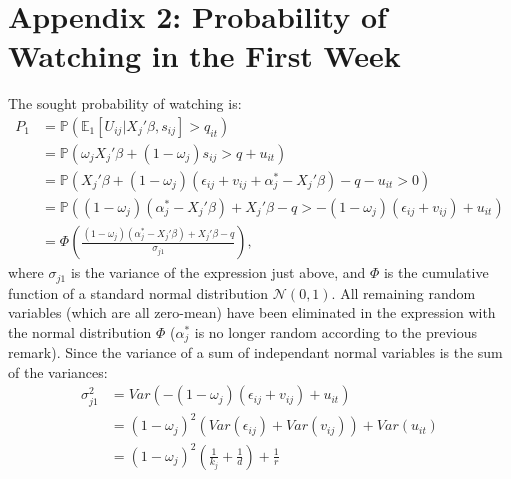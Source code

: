 \section*{Appendix 2: Probability of Watching in the First Week}

The sought probability of watching is:
\begin{align*}
	P_{1}&=\mathbb{P}(\mathbb{E}_1[U_{i j}|X_{j}'\beta, s_{i j}]>q_{i t})\\
	&=\mathbb{P}(\omega_{j} X_{j}'\beta+(1-\omega_{j})s_{i j}>q+u_{i t})\\
	&=\mathbb{P}(X_{j}'\beta+(1-\omega_{j})(\epsilon_{i j}+v_{i j}+\alpha_{j}^{*}-X_{j}'\beta)-q-u_{i t}>0)\\
	&=\mathbb{P}((1-\omega_{j})(\alpha_{j}^{*}-X_{j}'\beta)+X_{j}'\beta-q>-(1-\omega_{j})(\epsilon_{i j}+v_{i j})+u_{i t})\\
	&=\Phi\left(\frac{(1-\omega_{j})(\alpha_{j}^{*}-X_{j}'\beta)+X_{j}'\beta-q}{\sigma_{j 1}}\right),
\end{align*}
where $\sigma_{j 1}$ is the variance of the expression just above, and $\Phi$ is the cumulative function of a standard normal distribution $\mathcal{N}(0,1)$. All remaining random variables (which are all zero-mean) have been eliminated in the expression with the normal distribution $\Phi$ ($\alpha_{j}^{*}$ is no longer random according to the previous remark). Since the variance of a sum of independant normal variables is the sum of the variances: 
\begin{align*}
	\sigma_{j 1}^{2}
	&=Var(-(1-\omega_{j})(\epsilon_{i j}+v_{i j})+u_{i t})\\
	&=(1-\omega_{j})^{2}(Var(\epsilon_{i j})+Var(v_{i j}))+Var(u_{i t})\\
	&=(1-\omega_{j})^{2}\left(\frac{1}{k_{j}}+\frac{1}{d}\right)+\frac{1}{r}
\end{align*}
	
